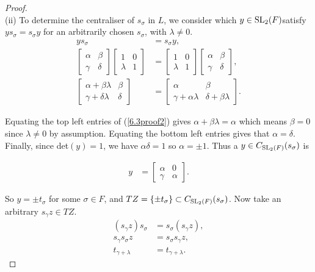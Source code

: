\begin{proof}
\\
(ii) To determine the centraliser of $s_\sigma$ in $L$, we consider which $y \in \operatorname{SL}_2(F)$satisfy $y s_\sigma = s_\sigma y$ for an arbitrarily chosen $s_\sigma$, with $\lambda \neq 0$. \\
\vspace{-0.5mm}
\begin{align}\label{6.3proof2} y s_\sigma &= s_\sigma y, \nonumber \\[1.5ex]
\begin{bmatrix} \alpha & \beta \\ \gamma & \delta \end{bmatrix} \begin{bmatrix} 1 & 0 \\ \lambda & 1 \end{bmatrix} &= \begin{bmatrix} 1 & 0 \\ \lambda & 1 \end{bmatrix} \begin{bmatrix} \alpha & \beta \\ \gamma & \delta \end{bmatrix}, \nonumber \\[1.5ex]
\begin{bmatrix} \alpha + \beta \lambda & \beta \\ \gamma + \delta \lambda & \delta \end{bmatrix} &= \begin{bmatrix} \alpha & \beta \\ \gamma +  \alpha \lambda & \delta + \beta \lambda \end{bmatrix}.
\end{align}
\vspace{.5mm}

Equating the top left entries of (\ref{6.3proof2}) gives $\alpha + \beta \lambda = \alpha$ which means $\beta = 0$ since $\lambda \neq 0$ by assumption. Equating the bottom left entries gives that $\alpha = \delta$. Finally, since det$(y) = 1$, we have $\alpha \delta = 1$ so $\alpha = \pm 1$. Thus a $y \in C_{\operatorname{SL}_2(F)}(s_\sigma)$ is

\begin{align*} y &= \begin{bmatrix} \alpha & 0 \\ \gamma & \alpha \end{bmatrix}. \tag{where $\alpha = \pm 1$}
\end{align*}

So $y = \pm t_\sigma$ for some $\sigma \in F$, and $TZ = \{ \pm t_\sigma \} \subset C_{\operatorname{SL}_2(F)}(s_\sigma)$. Now take an arbitrary $s_\gamma z \in TZ$.
\begin{align*} (s_\gamma z) s_\sigma &= s_\sigma (s_\gamma z),
\\ s_\gamma s_\sigma z &= s_\sigma s_\gamma z, \tag{since $z \in Z$}
\\ t_{\gamma + \lambda} &= t_{\gamma + \lambda}.
\end{align*}


\end{proof}
